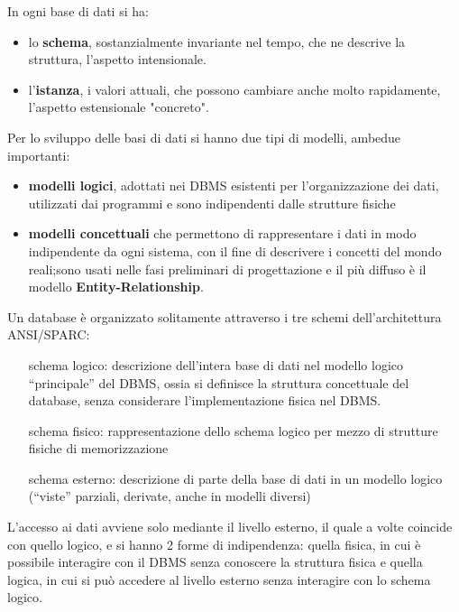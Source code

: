 \documentclass[a4paper,12pt, oneside]{book}
\begin{document}
In ogni base di dati si ha:
\begin{itemize}
    \item lo \textbf{schema}, sostanzialmente invariante nel tempo, che ne descrive la struttura, l'aspetto intensionale.
    \item l'\textbf{istanza}, i valori attuali, che possono cambiare anche molto rapidamente, l'aspetto estensionale "concreto".
\end{itemize}
Per lo sviluppo delle basi di dati si hanno due tipi di modelli, ambedue importanti:
\begin{itemize}
    \item \textbf{modelli logici}, adottati nei DBMS esistenti per l'organizzazione dei dati, 
            utilizzati dai programmi e sono indipendenti dalle strutture fisiche
    \item \textbf{modelli concettuali} che permettono di rappresentare i dati in modo indipendente da ogni sistema,
            con il fine di descrivere i concetti del mondo reali;sono usati nelle fasi preliminari di progettazione 
            e il più diffuso è il modello \textbf{Entity-Relationship}.
\end{itemize}
Un database è organizzato solitamente attraverso i tre schemi dell'architettura ANSI/SPARC:
\begin{enumerate}
        \item [schema logico:] descrizione dell'intera base di dati nel modello logico “principale” del DBMS,
                ossia si definisce la struttura concettuale del database, 
                senza considerare l'implementazione fisica nel DBMS.
        \item [schema fisico:] rappresentazione dello schema logico per mezzo di strutture fisiche di memorizzazione
        \item [schema esterno:] descrizione di parte della base di dati in un modello logico
                (“viste” parziali, derivate, anche in modelli diversi)
\end{enumerate}
L'accesso ai dati avviene solo mediante il livello esterno, il quale a volte coincide con quello logico, 
e si hanno 2 forme di indipendenza: quella fisica, in cui è possibile interagire con il DBMS senza conoscere la struttura fisica
e quella logica, in cui si può accedere al livello esterno senza interagire con lo schema logico.
\end{document}
